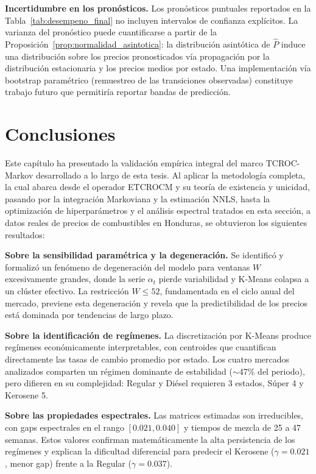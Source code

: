 \textbf{Incertidumbre en los pronósticos.}  Los pronósticos
puntuales reportados en la Tabla~\ref{tab:desempeno_final}
no incluyen intervalos de confianza explícitos.  La varianza del
pronóstico puede cuantificarse a partir de la
Proposición~\ref{prop:normalidad_asintotica}: la distribución
asintótica de $\hat{P}$ induce una distribución sobre los precios
pronosticados vía propagación por la distribución estacionaria y
los precios medios por estado.  Una implementación vía
bootstrap paramétrico (remuestreo de las transiciones observadas)
constituye trabajo futuro que permitiría reportar bandas de
predicción.

\section{Conclusiones}
\label{sec:combustibles_conclusiones}

Este capítulo ha presentado la validación empírica integral del marco
TCROC-Markov desarrollado a lo largo de esta tesis.  Al aplicar la
metodología completa, la cual abarca desde el operador ETCROCM y su teoría de
existencia y unicidad, pasando por la integración Markoviana
y la estimación NNLS, hasta la optimización de
hiperparámetros y el análisis espectral tratados en esta sección, a datos
reales de precios de combustibles en Honduras, se obtuvieron los
siguientes resultados:

\textbf{Sobre la sensibilidad paramétrica y la degeneración.}  Se
identificó y formalizó un fenómeno de degeneración del modelo para
ventanas $W$ excesivamente grandes, donde la serie $\alpha_t$ pierde
variabilidad y K-Means colapsa a un clúster efectivo.  La restricción
$W \le 52$, fundamentada en el ciclo anual del mercado, previene esta
degeneración y revela que la predictibilidad de los precios está
dominada por tendencias de largo plazo.

\textbf{Sobre la identificación de regímenes.}  La discretización por
K-Means produce regímenes económicamente interpretables, con
centroides que cuantifican directamente las tasas de cambio promedio
por estado.  Los cuatro mercados analizados comparten un régimen
dominante de estabilidad ($\sim$47\% del periodo), pero difieren en
su complejidad: Regular y Diésel requieren 3 estados, Súper 4 y
Kerosene 5.

\textbf{Sobre las propiedades espectrales.}  Las matrices estimadas
son irreducibles, con gaps espectrales en el rango $[0.021, 0.040]$
y tiempos de mezcla de 25 a 47 semanas.  Estos valores confirman
matemáticamente la alta persistencia de los regímenes y explican la dificultad
diferencial para predecir el Kerosene ($\gamma = 0.021$, menor gap)
frente a la Regular ($\gamma = 0.037$).

